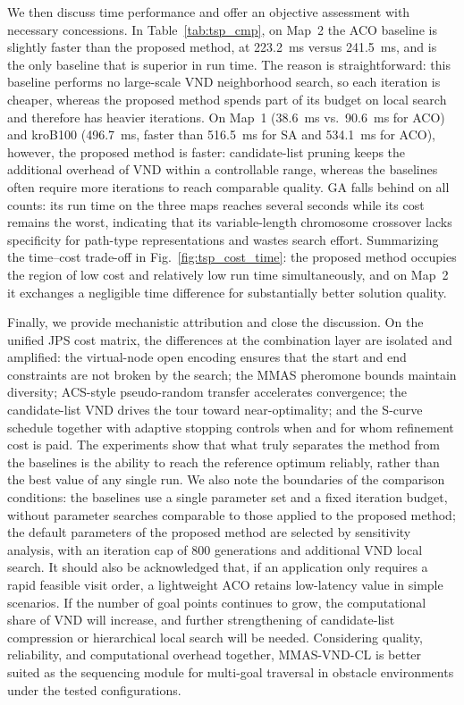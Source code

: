 We then discuss time performance and offer an objective assessment with necessary concessions. In Table~\textcolor{blue}{\ref{tab:tsp_cmp}}, on Map~2 the ACO baseline is slightly faster than the proposed method, at 223.2~ms versus 241.5~ms, and is the only baseline that is superior in run time. The reason is straightforward: this baseline performs no large-scale VND neighborhood search, so each iteration is cheaper, whereas the proposed method spends part of its budget on local search and therefore has heavier iterations. On Map~1 (38.6~ms vs.\ 90.6~ms for ACO) and kroB100 (496.7~ms, faster than 516.5~ms for SA and 534.1~ms for ACO), however, the proposed method is faster: candidate-list pruning keeps the additional overhead of VND within a controllable range, whereas the baselines often require more iterations to reach comparable quality. GA falls behind on all counts: its run time on the three maps reaches several seconds while its cost remains the worst, indicating that its variable-length chromosome crossover lacks specificity for path-type representations and wastes search effort. Summarizing the time--cost trade-off in Fig.~\textcolor{blue}{\ref{fig:tsp_cost_time}}: the proposed method occupies the region of low cost and relatively low run time simultaneously, and on Map~2 it exchanges a negligible time difference for substantially better solution quality.

Finally, we provide mechanistic attribution and close the discussion. On the unified JPS cost matrix, the differences at the combination layer are isolated and amplified: the virtual-node open encoding ensures that the start and end constraints are not broken by the search; the MMAS pheromone bounds maintain diversity; ACS-style pseudo-random transfer accelerates convergence; the candidate-list VND drives the tour toward near-optimality; and the S-curve schedule together with adaptive stopping controls when and for whom refinement cost is paid. The experiments show that what truly separates the method from the baselines is the ability to reach the reference optimum reliably, rather than the best value of any single run. We also note the boundaries of the comparison conditions: the baselines use a single parameter set and a fixed iteration budget, without parameter searches comparable to those applied to the proposed method; the default parameters of the proposed method are selected by sensitivity analysis, with an iteration cap of 800 generations and additional VND local search. It should also be acknowledged that, if an application only requires a rapid feasible visit order, a lightweight ACO retains low-latency value in simple scenarios. If the number of goal points continues to grow, the computational share of VND will increase, and further strengthening of candidate-list compression or hierarchical local search will be needed. Considering quality, reliability, and computational overhead together, MMAS-VND-CL is better suited as the sequencing module for multi-goal traversal in obstacle environments under the tested configurations.

